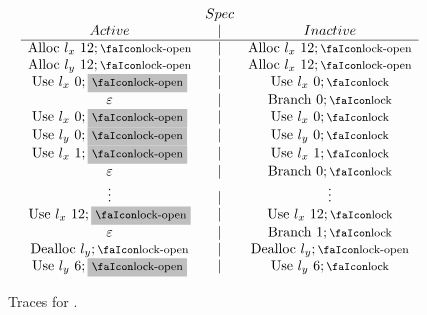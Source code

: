 \documentclass[dvipsnames,conference]{IEEEtran}
\theoremstyle{definition}
\begin{document}
\begin{figure}[!htb]
$$\begin{array}{ccc}
  \end{array}
  $$
  $$
  \begin{array}{ccc}
          & Spec & \\
     Active & \mid & Inactive \\\hline
     \ev{Alloc}\ \loc_{x}\ 12;\unlock & \mid & \ev{Alloc}\ \loc_{x}\ 12;\unlock\\
     \ev{Alloc}\ \loc_{y}\ 12;\unlock & \mid & \ev{Alloc}\ \loc_{x}\ 12;\unlock\\
     \ev{Use}\ \loc_{x}\ 0;\text{\colorbox{lightgray}{$\unlock$}} & \mid & \ev{Use}\ \loc_{x}\ 0;\lock\\
     \emptyevent & \mid & \ev{Branch}\ 0;\lock\\
     \ev{Use}\ \loc_{x}\ 0;\text{\colorbox{lightgray}{$\unlock$}} & \mid & \ev{Use}\ \loc_{x}\ 0;\lock\\
     \ev{Use}\ \loc_{y}\ 0;\text{\colorbox{lightgray}{$\unlock$}} & \mid & \ev{Use}\ \loc_{y}\ 0;\lock\\
     \ev{Use}\ \loc_{x}\ 1;\text{\colorbox{lightgray}{$\unlock$}} & \mid & \ev{Use}\ \loc_{x}\ 1;\lock\\
     \emptyevent & \mid & \ev{Branch}\ 0;\lock\\
     \vdots & \mid & \vdots \\
      \ev{Use}\ \loc_{x}\ 12;\text{\colorbox{lightgray}{$\unlock$}} & \mid & \ev{Use}\ \loc_{x}\ 12;\lock\\
      \emptyevent & \mid & \ev{Branch}\ 1;\lock\\
      \ev{Dealloc}\ \loc_{y};\unlock & \mid & \ev{Dealloc}\ \loc_{y};\unlock\\
      \ev{Use}\ \loc_{y}\ 6;\text{\colorbox{lightgray}{$\unlock$}} & \mid & \ev{Use}\ \loc_{y}\ 6;\lock\\
  \end{array}
  $$
  \caption{Traces for .}
  \label{fig:ex-cct}
\end{figure}
\end{document}
